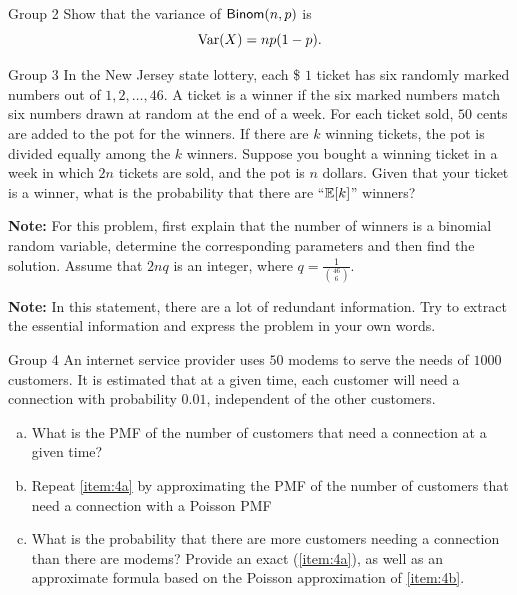 \documentclass{article}
\begin{document}
\begin{problem}
    {Group 2}
    Show that the variance of $\mathsf{Binom}(n,p)$ is
    \[\mathop{\mathrm{Var}}\nolimits(X)=np(1-p).\]
\end{problem}

\begin{problem}
    {Group 3}
    In the New Jersey state lottery, each \$ $1$ ticket has six randomly marked numbers out of $1, 2, \dots , 46$. A ticket is a winner if the six marked numbers match six numbers drawn at random at the end of a week. For each ticket sold, $50$ cents are added to the pot for the winners. If there are $k$ winning tickets, the pot is divided equally among the $k$ winners. Suppose you bought a winning ticket in a week in which $2n$ tickets are sold, and the pot is $n$ dollars. Given that your ticket is a winner, what is the probability that there are ``$\E{k}$'' winners?

    \textbf{Note:} For this problem, first explain that the number of winners is a binomial random variable, determine the corresponding parameters and then find the solution. Assume that $2nq$ is an integer, where $q=\frac{1}{\binom{46}{6}}$.

    \textbf{Note:} In this statement, there are a lot of redundant information. Try to extract the essential information and express the problem in your own words.
\end{problem}

\begin{problem}
    {Group 4}
    An internet service provider uses $50$ modems to serve the needs of $1000$ customers. It is estimated that at a given time, each customer will need a connection with probability $0.0 1$, independent of the other customers.
    \begin{enumerate}[(a)]
        \item What is the PMF of the number of customers that need a connection at a given time?\label{item:4a}
        \item Repeat \cref{item:4a} by approximating the PMF of the number of customers that need a connection with a Poisson PMF\label{item:4b}
        \item What is the probability that there are more customers needing a connection than there are modems? Provide an exact (\cref{item:4a}), as well as an approximate formula based on the Poisson approximation of \cref{item:4b}.
    \end{enumerate}
\end{problem}
\end{document}
